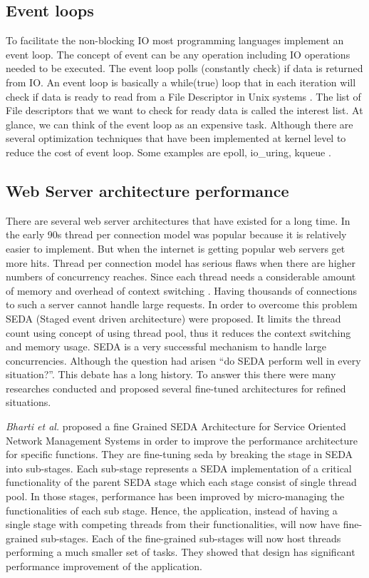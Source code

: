 \subsection{Event loops}
To facilitate the non-blocking IO most programming languages implement an event loop. The concept
of event can be any operation including IO operations needed to be executed. The event loop polls
(constantly check) if data is returned from IO. An event loop is basically a while(true) loop that in
each iteration will check if data is ready to read from a File Descriptor in Unix systems \cite{device_file}. The
list of File descriptors that we want to check for ready data is called the interest list. At glance, we can
think of the event loop as an expensive task. Although there are several optimization techniques that
have been implemented at kernel level to reduce the cost of event loop. Some examples are epoll,
io{\_}uring, kqueue \cite{web_pipeline,io_uring}.


\subsection{Web Server architecture performance}

There are several web server architectures that have existed for a long time. In the early 90s thread per connection model was popular because it is relatively easier to implement. But when the internet is getting popular web servers get more hits. Thread per connection model has serious flaws when there are higher numbers of concurrency reaches. Since each thread needs a considerable amount of memory and overhead of context switching \cite{seda}. Having thousands of connections to such a server cannot handle large requests. In order to overcome this problem SEDA (Staged event driven architecture) \cite{seda} were proposed. It limits the thread count using concept of using thread pool, thus it reduces the context switching and memory usage. SEDA is a very successful mechanism to handle large concurrencies. Although the question had arisen “do SEDA perform well in every situation?”. \cite{Scalable_Threads_for_Internet_Services,events_are_bad,event_deriven_programming_for_robust_software} This debate has a long history. To answer this there were many researches conducted and proposed several fine-tuned architectures for refined situations.

\textit{Bharti et al.} \cite{fine_grained_SEDA} proposed a fine Grained SEDA Architecture for Service Oriented Network Management Systems in order to improve the performance architecture for specific functions. They are fine-tuning \acrshort{seda} by breaking the stage in SEDA into sub-stages. Each sub-stage represents a SEDA implementation of a critical functionality of the parent SEDA stage which each stage consist of single thread pool. In those stages, performance has been improved by micro-managing the functionalities of each sub stage. Hence, the application, instead of having a single stage with competing threads from their functionalities, will now have fine-grained sub-stages. Each of the fine-grained sub-stages will now host threads performing a much smaller set of tasks. They showed that design has significant performance improvement of the application. 

